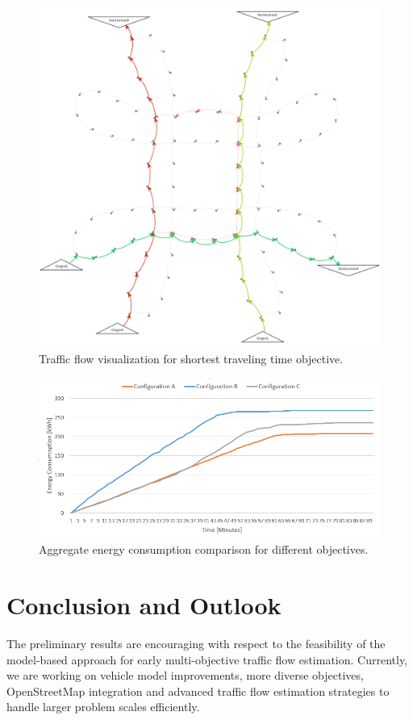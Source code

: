 \documentclass[conference]{../cls/IEEEtran}
\begin{document}
\begin{figure}[t!]
	\centering
	\includegraphics[width=0.93\columnwidth]{../gfx/graph.png}
	\caption{Traffic flow visualization for shortest traveling time objective.}
	\label{figure:graph}
\end{figure}

\begin{figure}[t!]
	\centering
	\includegraphics[width=0.93\columnwidth]{../gfx/chart.png}
	\caption{Aggregate energy consumption comparison for different objectives.}
	\label{figure:chart}
\end{figure}

\section{Conclusion and Outlook}

The preliminary results are encouraging with respect to the feasibility of the model-based approach for early multi-objective traffic flow estimation. Currently, we are working on vehicle model improvements, more diverse objectives, OpenStreetMap integration and advanced traffic flow estimation strategies to handle larger problem scales efficiently.



\end{document}
